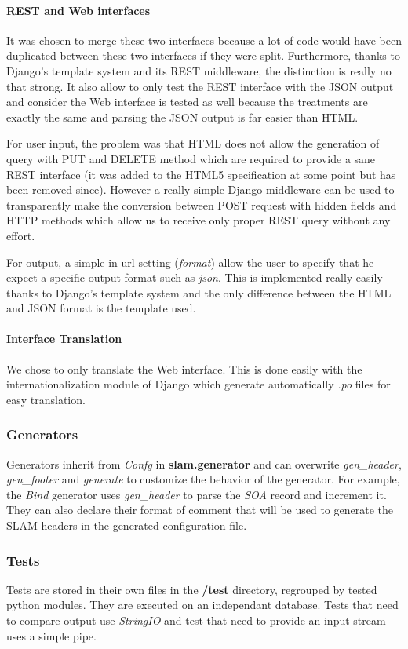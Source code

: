\documentclass[12pt,a4paper,twoside]{report}
\begin{document}
\paragraph{REST and Web interfaces}
\label{internal_general:rest-and-web-interfaces}
It was chosen to merge these two interfaces because a lot of code would have
been duplicated between these two interfaces if they were split. Furthermore,
thanks to Django's template system and its REST middleware, the distinction is
really no that strong. It also allow to only test the REST interface with the
JSON output and consider the Web interface is tested as well because the
treatments are exactly the same and parsing the JSON output is far easier than
HTML.

For user input, the problem was that HTML does not allow the generation of
query with PUT and DELETE method which are required to provide a sane REST
interface (it was added to the HTML5 specification at some point but has been
removed since). However a really simple Django middleware can be used to
transparently make the conversion between POST request with hidden fields and
HTTP methods which allow us to receive only proper REST query without any
effort.

For output, a simple in-url setting (\emph{format}) allow the user to specify that
he expect a specific output format such as \emph{json}. This is implemented really
easily thanks to Django's template system and the only difference between the
HTML and JSON format is the template used.


\paragraph{Interface Translation}
\label{internal_general:interface-translation}
We chose to only translate the Web interface. This is done easily with the
internationalization module of Django which generate automatically \emph{.po} files
for easy translation.


\subsubsection{Generators}
\label{internal_general:generators}
Generators inherit from \emph{Confg} in \textbf{slam.generator} and can overwrite
\emph{gen\_header}, \emph{gen\_footer} and \emph{generate} to customize the behavior of the
generator. For example, the \emph{Bind} generator uses \emph{gen\_header} to parse the
\emph{SOA} record and increment it. They can also declare their format of comment
that will be used to generate the SLAM headers in the generated configuration
file.


\subsubsection{Tests}
\label{internal_general:tests}
Tests are stored in their own files in the \textbf{/test} directory, regrouped by
tested python modules. They are executed on an independant database. Tests that
need to compare output use \emph{StringIO} and test that need to provide an input
stream uses a simple pipe.
\end{document}
